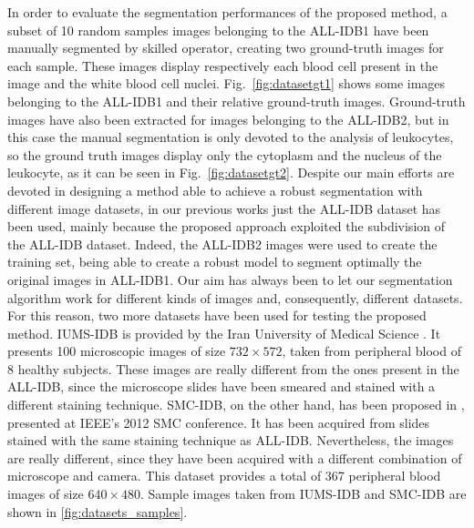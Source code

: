 \documentclass[final,a4paper,12pt,english]{UnicaPhdThesis3}
\begin{document}
In order to evaluate the segmentation performances of the proposed method, a subset of 10 random samples images belonging to the ALL-IDB1 have been manually segmented by skilled operator, creating two ground-truth images for each sample. These images display respectively each blood cell present in the image and the white blood cell nuclei. Fig.~\ref{fig:datasetgt1} shows some images belonging to the ALL-IDB1 and their relative ground-truth images. Ground-truth images have also been extracted for images belonging to the ALL-IDB2, but in this case the manual segmentation is only devoted to the analysis of leukocytes, so the ground truth images display only the cytoplasm and the nucleus of the leukocyte, as it can be seen in Fig.~\ref{fig:datasetgt2}.
Despite our main efforts are devoted in designing a method able to achieve a robust segmentation with different image datasets, in our previous works \cite{Put15c,Put15d}  just the ALL-IDB dataset has been used, mainly because the proposed approach exploited the subdivision of the ALL-IDB dataset. Indeed, the ALL-IDB2 images were used to create the training set, being able to create a robust model to segment optimally the original images in ALL-IDB1. Our aim has always been to let our segmentation algorithm work for different kinds of images and, consequently, different datasets. 
For this reason, two more datasets have been used for testing the proposed method. 
IUMS-IDB is provided by the Iran University of Medical Science \cite{Sarrafzadeh}. It presents 100 microscopic images of size $732 \times 572$, taken from peripheral blood of 8 healthy subjects. These images are really different from the ones present in the ALL-IDB, since the microscope slides have been smeared and stained with a different staining technique. SMC-IDB, on the other hand, has been proposed in \cite{Mohamed}, presented at IEEE's 2012 SMC conference. It has been acquired from slides stained with the same staining technique as ALL-IDB. Nevertheless, the images are really different, since they have been acquired with a different combination of microscope and camera. This dataset provides a total of 367 peripheral blood images of size $640 \times 480$.
Sample images taken from IUMS-IDB and SMC-IDB are shown in \ref{fig:datasets_samples}.
\end{document}
